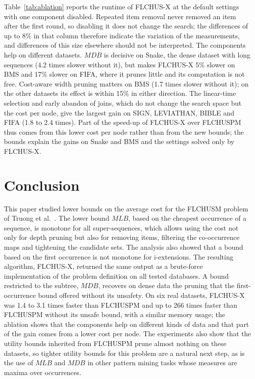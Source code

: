 \documentclass[pdflatex,sn-mathphys,Numbered]{sn-jnl}
\theoremstyle{thmstyleone}
\theoremstyle{thmstyletwo}
\theoremstyle{thmstylethree}
\newcommand{\FL}{\textsc{FLCHUSPM}}
\newcommand{\FX}{\textsc{FLCHUS-X}}
\newcommand{\mlb}{\ensuremath{\mathit{MLB}}}
\newcommand{\mdb}{\ensuremath{\mathit{MDB}}}
\begin{document}
Table~\ref{tab:ablation} reports the runtime of \FX{} at the default settings with one component
disabled. Repeated item removal never removed an item after the first round, so disabling it does
not change the search; the differences of up to 8\% in that column therefore indicate the
variation of the measurements, and differences of this size elsewhere should not be
interpreted. The components help on different datasets. \mdb{} is decisive on Snake, the dense
dataset with long sequences (4.2 times slower without it), but makes \FX{} 5\% slower on BMS and
17\% slower on FIFA, where it prunes little and its computation is not free. Cost-aware width
pruning matters on BMS (1.7 times slower without it); on the other datasets its effect is within
15\% in either direction.
The linear-time selection and early abandon of joins, which do not change the search space but
the cost per node, give the largest gain on SIGN, LEVIATHAN, BIBLE and FIFA (1.8 to 2.4 times).
Part of the speed-up of \FX{} over \FL{} thus comes from this lower cost per node rather than
from the new bounds; the bounds explain the gains on Snake and BMS and the settings solved
only by \FX{}.

\begin{table}[t]
\centering
\caption{Ablation: median runtime (s) of \FX{} at the default setting and with one component
disabled (ratio to \FX{} in parentheses).}
\label{tab:ablation}
{\footnotesize{}}
\end{table}

\section{Conclusion}\label{sec:concl}

This paper studied lower bounds on the average cost for the FLCHUSM problem of Truong et al.\
\cite{truong2022}. The lower bound \mlb{}, based on the cheapest occurrence of a sequence, is
monotone for all super-sequences, which allows using the cost not only for depth pruning but
also for removing items, filtering the co-occurrence maps and tightening the candidate sets. The
analysis also showed that a bound based on the first occurrence is not monotone for
i-extensions. The resulting algorithm, \FX{}, returned the same output as a brute-force
implementation of the problem definition on all tested databases.
A bound restricted to the subtree, \mdb{}, recovers on dense data the pruning that the
first-occurrence bound offered without its unsafety. On six real datasets, \FX{} was 1.4 to 3.1
times faster than \FL{} and up to 266 times faster than \FL{} without its unsafe bound, with a
similar memory usage; the ablation shows that the components help on different kinds of data
and that part of the gain comes from a lower cost per node. The experiments also show that the
utility bounds inherited from \FL{} prune almost nothing on these datasets, so tighter utility
bounds for this problem are a natural next step, as is the use of \mlb{} and \mdb{} in other
pattern mining tasks whose measures are maxima over occurrences.
\end{document}
